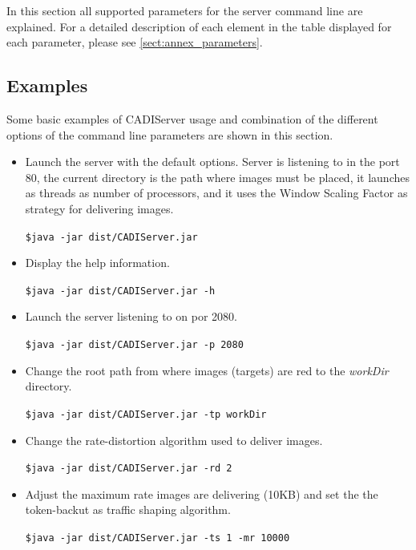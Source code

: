\documentclass[a4paper,10pt]{article}
\begin{document}
In this section all supported parameters for the server command line are explained.
For a detailed description of each element in the table displayed for each parameter,
please see \ref{sect:annex_parameters}.






\subsection{Examples}
\label{sect:examples}

Some basic examples of CADIServer usage and combination of the different options
of the command line parameters are shown in this section.

\begin{itemize}
	\item Launch the server with the default options. Server is listening to in the
	port 80, the current directory is the path where images must be placed, it
	launches as threads as number of processors, and it uses the Window Scaling
	Factor as strategy for delivering images.
	\begin{framed}
	\texttt{\$java -jar dist/CADIServer.jar}
	\end{framed}

	\item Display the help information.
	\begin{framed}
	\texttt{\$java -jar dist/CADIServer.jar -h}
	\end{framed}
	
	\item Launch the server listening to on por 2080.
	\begin{framed}
	\texttt{\$java -jar dist/CADIServer.jar -p 2080}
	\end{framed}
	
	\item Change the root path from where images (targets) are red to the \emph{workDir} directory.
	\begin{framed}
	\texttt{\$java -jar dist/CADIServer.jar -tp workDir}
	\end{framed}

	\item Change the rate-distortion algorithm used to deliver images.
	\begin{framed}
	\texttt{\$java -jar dist/CADIServer.jar -rd 2}
	\end{framed}
	
	\item Adjust the maximum rate images are delivering (10KB) and set the 
	the token-backut as traffic shaping algorithm.
	\begin{framed}
	\texttt{\$java -jar dist/CADIServer.jar -ts 1 -mr 10000}
	\end{framed}
	
\end{itemize}
\end{document}
